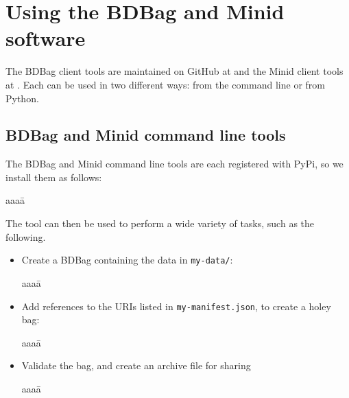 \documentclass[11pt]{article}
\begin{document}
\section{Using the BDBag and Minid software}

The BDBag client tools are maintained on GitHub at  and the 
Minid client tools at .
Each can be used in two different ways: from the command line or from Python.

\subsection{BDBag and Minid command line tools} 

The BDBag and Minid command line tools are each registered with PyPi, 
so we install them as follows:
\vspace{-1ex}
\begin{tabbing}
aaaa\=\kill
\>\\
\>
\end{tabbing}

\noindent
The  tool can then be used to perform a wide variety of tasks, such as the following.
\begin{itemize}
\vspace{-1ex}

\item
Create a BDBag containing the data in \texttt{my-data/}:
\vspace{-2ex}
\begin{tabbing}
aaaa\=\kill
\>
\end{tabbing}

\vspace{-2ex}

\item
Add references to the URIs listed in \texttt{my-manifest.json}, to create a holey bag:
\vspace{-2ex}
\begin{tabbing}
aaaa\=\kill
\>
\end{tabbing}

\vspace{-2ex}

\item
Validate the bag, and create an archive file for sharing
\vspace{-2ex}
\begin{tabbing}
aaaa\=\kill
\>
\end{tabbing}

\vspace{-2ex}

\end{itemize}
\end{document}
